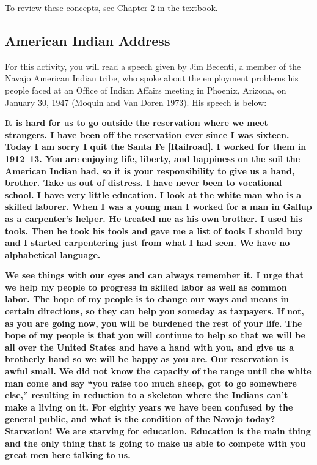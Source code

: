 \documentclass[
]{report}
\begin{document}
To review these concepts, see Chapter 2 in the textbook.

\hypertarget{american-indian-address}{%
\subsection{American Indian Address}\label{american-indian-address}}

For this activity, you will read a speech given by Jim Becenti, a member of the Navajo American Indian tribe, who spoke about the employment problems his people faced at an Office of Indian Affairs meeting in Phoenix, Arizona, on January 30, 1947 (Moquin and Van Doren 1973). His speech is below:

\textbf{It is hard for us to go outside the reservation where we meet strangers. I have been off the reservation ever since I was sixteen. Today I am sorry I quit the Santa Fe {[}Railroad{]}. I worked for them in 1912--13. You are enjoying life, liberty, and happiness on the soil the American Indian had, so it is your responsibility to give us a hand, brother. Take us out of distress. I have never been to vocational school. I have very little education. I look at the white man who is a skilled laborer. When I was a young man I worked for a man in Gallup as a carpenter's helper. He treated me as his own brother. I used his tools. Then he took his tools and gave me a list of tools I should buy and I started carpentering just from what I had seen. We have no alphabetical language.}

\textbf{We see things with our eyes and can always remember it. I urge that we help my people to progress in skilled labor as well as common labor. The hope of my people is to change our ways and means in certain directions, so they can help you someday as taxpayers. If not, as you are going now, you will be burdened the rest of your life. The hope of my people is that you will continue to help so that we will be all over the United States and have a hand with you, and give us a brotherly hand so we will be happy as you are. Our reservation is awful small. We did not know the capacity of the range until the white man come and say ``you raise too much sheep, got to go somewhere else,'' resulting in reduction to a skeleton where the Indians can't make a living on it. For eighty years we have been confused by the general public, and what is the condition of the Navajo today? Starvation! We are starving for education. Education is the main thing and the only thing that is going to make us able to compete with you great men here talking to us.}
\end{document}
